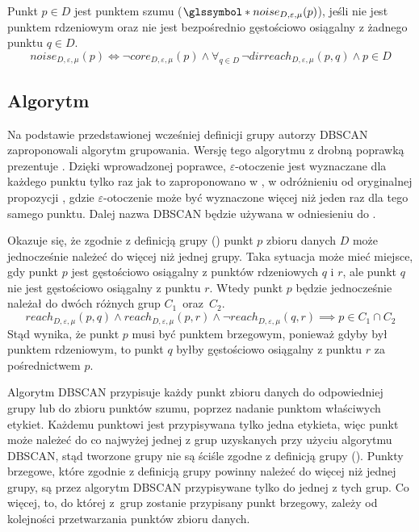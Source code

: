 \newline
Punkt $ p\in D $ jest punktem szumu ($ \s{noise}_{D,\varepsilon,\mu}(p) $), jeśli nie jest punktem rdzeniowym oraz nie jest bezpośrednio gęstościowo osiągalny z żadnego punktu $q \in D$. 
\begin{equation}
	noise_{D,\varepsilon,\mu}(p) \iff \neg core_{D,\varepsilon,\mu}(p) \land \forall_{q\in D}\,\neg dirreach_{D,\varepsilon,\mu}(p, q) \land p \in D
\end{equation}

\subsection{Algorytm}
Na podstawie przedstawionej wcześniej definicji grupy autorzy DBSCAN zaproponowali algorytm grupowania. Wersję tego algorytmu z drobną poprawką prezentuje . Dzięki wprowadzonej poprawce, $ \varepsilon $-otoczenie jest wyznaczane dla każdego punktu tylko raz jak to zaproponowano w \cite{fasterdbscan}, w odróżnieniu od oryginalnej propozycji \cite{dbscan}, gdzie $ \varepsilon $-otoczenie może być wyznaczone więcej niż jeden raz dla tego samego punktu. Dalej nazwa DBSCAN będzie używana w odniesieniu do .

Okazuje się, że zgodnie z definicją grupy () punkt $ p $ zbioru danych $ D $ może jednocześnie należeć do więcej niż jednej grupy. Taka sytuacja może mieć miejsce, gdy punkt $ p $ jest gęstościowo osiągalny z punktów rdzeniowych $ q $ i $ r $, ale punkt $ q $ nie jest gęstościowo osiągalny z punktu $ r $. Wtedy punkt $ p $ będzie jednocześnie należał do dwóch różnych grup \mbox{$ C_1 $ oraz $ C_2 $}.
\begin{equation}
  reach_{D,\varepsilon,\mu}(p, q) \land reach_{D,\varepsilon,\mu}(p, r) \land 
  \neg reach_{D,\varepsilon,\mu}(q, r) \implies
  p \in C_1 \cap C_2
\end{equation}
Stąd wynika, że punkt $ p $ musi być punktem brzegowym, ponieważ gdyby był punktem rdzeniowym, to punkt $ q $ byłby gęstościowo osiągalny z punktu $ r $ za pośrednictwem $ p $.

Algorytm DBSCAN przypisuje każdy punkt zbioru danych do odpowiedniej grupy lub do zbioru punktów szumu, poprzez nadanie punktom właściwych etykiet. Każdemu punktowi jest przypisywana tylko jedna etykieta, więc punkt może należeć do co najwyżej jednej z grup uzyskanych przy użyciu algorytmu DBSCAN, stąd tworzone grupy nie są ściśle zgodne z definicją grupy (). Punkty brzegowe, które zgodnie z definicją grupy powinny należeć do więcej niż jednej grupy, są przez algorytm DBSCAN przypisywane tylko do jednej z tych grup. Co więcej, to, do której \mbox{z grup} zostanie przypisany punkt brzegowy, zależy od kolejności przetwarzania punktów zbioru danych.

